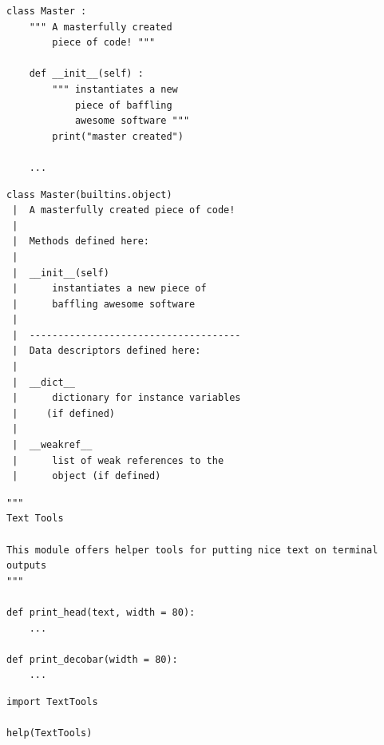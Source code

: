 \begin{frame}[fragile]
%
\begin{tcbraster}[raster columns=2,
                  raster equal height,
                  nobeforeafter,
                  raster column skip=0.5cm]
\begin{codebox}
\begin{verbatim}
class Master :
    """ A masterfully created
        piece of code! """
    
    def __init__(self) :
        """ instantiates a new
            piece of baffling
            awesome software """
        print("master created")
    
    ...
\end{verbatim}
\end{codebox}
%
\begin{cmdbox}
\begin{verbatim}
class Master(builtins.object)
 |  A masterfully created piece of code!
 |  
 |  Methods defined here:
 |  
 |  __init__(self)
 |      instantiates a new piece of
 |      baffling awesome software
 |  
 |  -------------------------------------
 |  Data descriptors defined here:
 |  
 |  __dict__
 |      dictionary for instance variables
 |     (if defined)
 |  
 |  __weakref__
 |      list of weak references to the
 |      object (if defined)
\end{verbatim}
\end{cmdbox}
\end{tcbraster}
%
\end{frame}


\begin{frame}[fragile]
%
\begin{codebox}
\begin{verbatim}
""" 
Text Tools

This module offers helper tools for putting nice text on terminal outputs
"""

def print_head(text, width = 80):
    ...

def print_decobar(width = 80):
    ...
\end{verbatim}
\end{codebox}
%
\begin{codebox}
\begin{verbatim}
import TextTools

help(TextTools)
\end{verbatim}
\end{codebox}
%
\end{frame}

